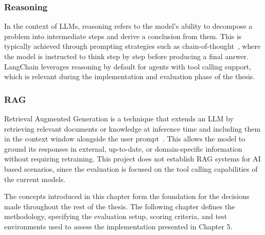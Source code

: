 \subsubsection{Reasoning}\label{subsubsec:reasoning-concept}
In the context of \glspl{LLM}, reasoning refers to the model's ability to decompose a problem into intermediate steps and derive a conclusion from them.
This is typically achieved through prompting strategies such as chain-of-thought~\cite{wei2022chain},
where the model is instructed to think step by step before producing a final answer.
\gls{LangChain} leverages reasoning by default for agents with tool calling support,
which is relevant during the implementation and evaluation phase of the thesis.

\subsubsection{\gls{RAG}}\label{subsubsec:rag-concept}
Retrieval Augmented Generation is a technique that extends an \gls{LLM} by retrieving relevant documents or knowledge at inference time and including them in the context window alongside the user prompt~\cite{lewis2020rag}.
This allows the model to ground its responses in external, up-to-date, or domain-specific information without requiring retraining.
This project does not establish \gls{RAG} systems for \gls{AI} based scenarios,
since the evaluation is focused on the tool calling capabilities of the current models.

The concepts introduced in this chapter form the foundation for the decisions made throughout the rest of the thesis.
The following chapter defines the methodology, specifying the evaluation setup, scoring criteria, and test environments used to assess the implementation presented in Chapter 5.
